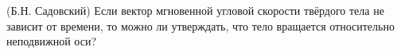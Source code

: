 (Б.Н. Садовский)
Если вектор мгновенной угловой скорости твёрдого тела не зависит от
времени, то можно ли утверждать, что тело вращается относительно
неподвижной оси?
